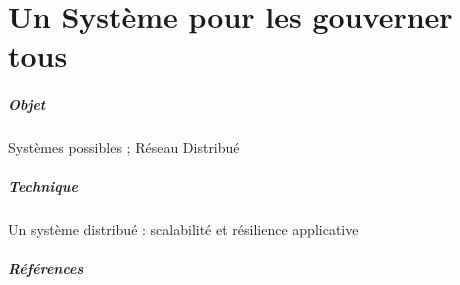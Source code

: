 \chapter{Un Système pour les gouverner tous}
\paragraph{Objet} Systèmes possibles ; Réseau Distribué
\paragraph{Technique} Un système distribué : scalabilité et résilience applicative
\paragraph{Références}
\cite{DarkWeb0}
\cite{Deleuze0}
\cite{Foucault0}
\cite{Negri0}
\cite{Pieces0}
\cite{ProgrammableCity0}
\cite{ProgrammableCity1}
\cite{PsychoPass}



 
